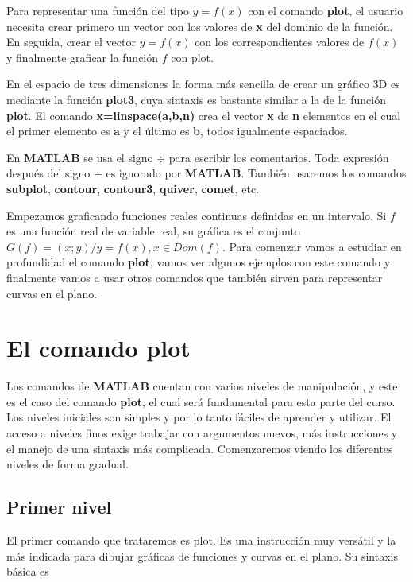 Para representar una función del tipo $y=f(x)$ con el comando \textbf{plot}, el usuario necesita crear primero un vector con los valores de \textbf{x} del dominio de la función. En seguida, crear el vector $y=f(x)$ con los correspondientes valores de $f(x)$ y finalmente graficar la función $f$ con plot.

En el espacio de tres dimensiones la forma más sencilla de crear un gráfico 3D es mediante la 
función \textbf{plot3}, cuya sintaxis es bastante similar a la de la función \textbf{plot}. El comando \textbf{x=linspace(a,b,n)} crea el vector \textbf{x} de \textbf{n} elementos en el cual el primer elemento es \textbf{a} y el último es \textbf{b}, todos igualmente espaciados.

En \textbf{MATLAB} se usa el signo $\div$ para escribir los comentarios. Toda expresión después del signo $\div$ es ignorado por \textbf{MATLAB}. También usaremos los comandos \textbf{subplot}, \textbf{contour}, \textbf{contour3}, \textbf{quiver}, \textbf{comet}, etc.

Empezamos graficando funciones reales continuas definidas en un intervalo. Si $f$ es una función real de variable real, su gráfica es el conjunto $G(f)={(x;y)/y=f(x), x \in Dom(f)}$. Para comenzar vamos a estudiar en profundidad el comando \textbf{plot}, vamos ver algunos ejemplos con este comando y finalmente vamos a usar otros comandos que también sirven para representar curvas en el plano.

\section{El comando plot}

Los comandos de \textbf{MATLAB} cuentan con varios niveles de manipulación, y este es el caso del comando \textbf{plot}, el cual será fundamental para esta parte del curso. Los niveles iniciales son simples y por lo tanto fáciles de aprender y utilizar. El acceso a niveles finos exige trabajar con argumentos nuevos, más instrucciones y el manejo de una sintaxis más complicada. Comenzaremos viendo los diferentes niveles de forma gradual.

\subsection{Primer nivel}
El primer comando que trataremos es plot. Es una instrucción muy versátil y la más indicada para dibujar gráficas de funciones y curvas en el plano. Su sintaxis básica es

